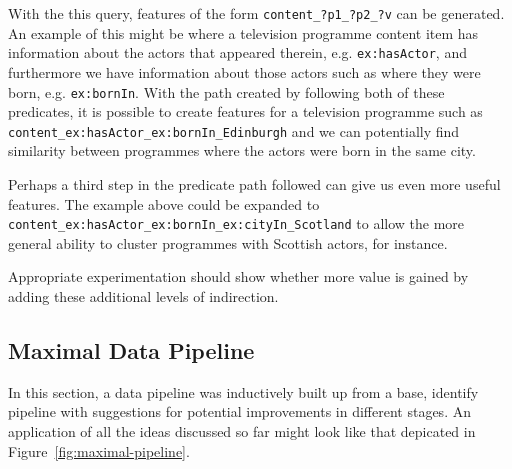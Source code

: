 With the this query, features of the form \texttt{content\_?p1\_?p2\_?v} can
be generated. An example of this might be where a television programme
content item has information about the actors that appeared therein, e.g.
\texttt{ex:hasActor}, and furthermore we have information about those actors
such as where they were born, e.g. \texttt{ex:bornIn}. With the path created
by following both of these predicates, it is possible to create features for
a television programme such as
\texttt{content\_ex:hasActor\_ex:bornIn\_Edinburgh} and we can potentially
find similarity between programmes where the actors were born in the same
city.

Perhaps a third step in the predicate path followed can give us even more
useful features. The example above could be expanded to
\texttt{content\_ex:hasActor\_ex:bornIn\_ex:cityIn\_Scotland} to allow the
more general ability to cluster programmes with Scottish actors, for instance.

Appropriate experimentation should show whether more value is gained by
adding these additional levels of indirection.

\subsection{Maximal Data Pipeline}

In this section, a data pipeline was inductively built up from a base,
identify pipeline with suggestions for potential improvements in different
stages. An application of all the ideas discussed so far might look like
that depicated in Figure~\ref{fig:maximal-pipeline}.

